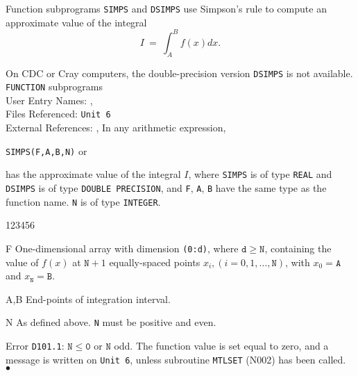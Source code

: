                                    
                            
\Submitter{}                                      
                          
Function subprograms {\tt SIMPS} and {\tt DSIMPS} use Simpson's rule to
compute an approximate value of the integral
$$ I \ = \ \int^B_Af(x)dx.$$
\par
On CDC or Cray computers, the double-precision version {\tt DSIMPS}
is not available.
\Structure
{\tt FUNCTION} subprograms\\
User Entry Names: ,  \\
Files Referenced: {\tt Unit 6} \\
External References: , 
\Usage
In any arithmetic expression,
\begin{center}
{\tt SIMPS(F,A,B,N)} \quad or 
\end{center}
has the approximate value of the integral $I$, where {\tt SIMPS} is of
type {\tt REAL} and {\tt DSIMPS} is of type {\tt DOUBLE PRECISION},
and {\tt F}, {\tt A}, {\tt B} have the same type as the function name.
{\tt N} is of type {\tt INTEGER}.
\begin{DLtt}{123456}
\item [F]  One-dimensional array with dimension {\tt (0:d)}, where
$\mathtt{d \geq N}$, containing the value of $f(x)$ at $\mathtt{N}+1$
equally-spaced points $x_i, (i=0,1,\ldots,\mathtt{N})$, with
$x_0 = \mathtt{A}$ and $x_{\mathtt{N}} = \mathtt{B}$.
\item[A,B]End-points of integration interval.
\item[N]As defined above. {\tt N} must be positive and even.
\end{DLtt}
\Errorh
Error {\tt D101.1}: $\mathtt{N \le 0}$ or $\mathtt{N}$ odd.
The function value is set equal to zero, and a message is written on
{\tt Unit 6}, unless subroutine {\tt MTLSET} (N002) has been called.
\\ $\bullet$
